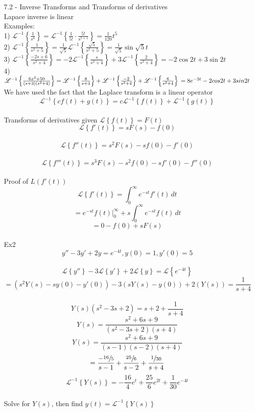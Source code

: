\documentclass[a4paper, 12pt]{article}
\renewcommand{\L}[1] {\ensuremath{\mathscr{L}\left\{#1\right\}}}
\newcommand{\Li}[1] {\ensuremath{\mathscr{L}^{-1}\left\{#1\right\}}}
\begin{document}
    7.2 - Inverse Transforms and Transforms of derivatives\\[20px]
    Lapace inverse is linear\\[20px]
    Examples:\\[20px]
    1) $\Li{\frac{1}{s^6}} = \Li{\frac{1}{5!}\cdot\frac{5!}{s^{5+1}}} = \frac{1}{120}t^5$\\[20px]
    
    2) $\Li{\frac{1}{s^2 + 5}} = \frac{1}{\sqrt{5}}\Li{\frac{\sqrt{5}}{s^2+5}} = \frac{1}{\sqrt{5}}\sin{\sqrt{5}t}$\\[20px]
    
    3) $\Li{\frac{-2s + 6}{s^2 + 4}} = -2\Li{\frac{s}{s^2+ 4}} + 3\Li{\frac{2}{s^2 + 4}} = -2\cos{2t} + 3\sin{2t} $\\[20px]
    
    4) $\Li{\frac{6x^2+50}{(s+3)(s^2+4)}} = \Li{\frac{8}{s+3}}+\Li{\frac{-2}{s^2+4}}+\Li{\frac{6}{s^2+4}}\\ = 8e^{-3t}-2cos{2t}+3sin{2t}$\\[20px]
    
    We have used the fact that the Laplace transform is a linear operator\\
    $$ \Li{cf(t) + g(t)} = c\Li{f(t)} + \Li{g(t)}$$\\[20px]
    Transforms of derivatives given $\L{f(t)} = F(t)$\\[20px]
    $$\L{f'(t)} = sF(s) - f(0)$$\\
    $$\L{f''(t)} = s^2F(s) - sf(0) - f'(0)$$\\
    $$\L{f'''(t)} = s^3F(s) - s^2f(0) - sf'(0) - f''(0)$$\\[20px]
    
    Proof of $L(f'(t))$\\[20px]
    $$ \L{f'(t)} = \int_0^{\infty}{e^{-st}f'(t)\,dt}$$
    $$ = e^{-st}f(t)|_0^{\infty} + s\int_0^{\infty}{e^{-st}f(t)\,dt}$$
    $$ = 0 - f(0) + sF(s) $$\\
    
    Ex2\\[20px]
    $$ y'' - 3y' + 2y = e^{-4t} , y(0)=1, y'(0) = 5$$\\
    $$ \L{y''} - 3\L{y'} + 2\L{y} = \L{e^{-4t}} $$
    $$ = (s^2Y(s) - sy(0) - y'(0)) - 3(sY(s) - y(0)) + 2(Y(s)) = \frac{1}{s+4}$$\\
    $$ Y(s)(s^2 - 3s + 2) = s + 2 + \frac{1}{s+4}$$
    $$ Y(s) = \frac{s^2 + 6s + 9}{(s^2 - 3s + 2)(s + 4)} $$
    $$ Y(s) = \frac{s^2 + 6s + 9}{(s-1)(s-2)(s + 4)} $$
    $$ = \frac{-\sfrac{16}{5}}{s-1} + \frac{\sfrac{25}{6}}{s-2} + \frac{\sfrac{1}{30}}{s + 4}$$
    $$ \Li{Y(s)} = -\frac{16}{4}e^t + \frac{25}{6}e^{2t} + \frac{1}{30}e^{-4t} $$\\
    Solve for $Y(s)$, then find $y(t) = \Li{Y(s)}$
    
    
    
\end{document}
